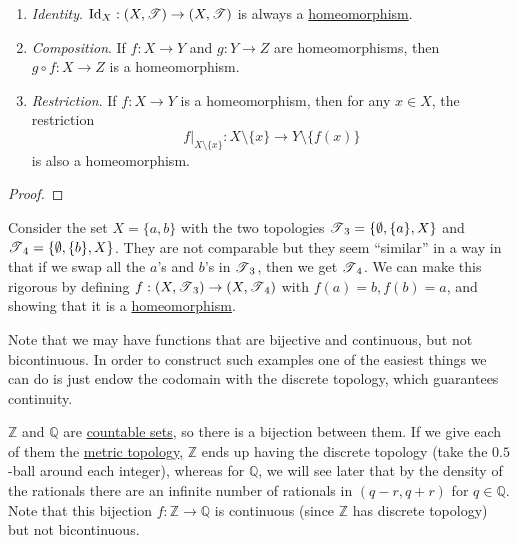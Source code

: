 	\begin{lemma}
	  \label{thm:properties-of-homeomorphisms}
	  \begin{enumerate}
	    \item \textit{Identity}. $\operatorname{Id}_X: (X, \operatorname{\mathscr{T}}) \to (X, \operatorname{\mathscr{T}})$ is always a \hyperref[def:homeomorphism]{homeomorphism}. 
			\item \textit{Composition}. If $f: X \to Y$ and $g: Y \to Z$ are homeomorphisms, then $g \circ f: X \to Z$ is a homeomorphism. 
			\item \textit{Restriction}. If $f: X \rightarrow Y$ is a homeomorphism, then for any $x \in X$, the restriction 
				\begin{equation}
					f|_{X \setminus \{x\}} : X \setminus \{x\} \rightarrow Y \setminus \{f(x)\}
				\end{equation}
				is also a homeomorphism. 
	  \end{enumerate}
	\end{lemma}
	\begin{proof}
	  
	\end{proof}

  \begin{example}
    \label{ex:comparability-and-homeomorphic-spaces}
    Consider the set $X = \{a, b\}$ with the two topologies $\operatorname{\mathscr{T}}_3 = \{\emptyset, \{a\}, X\}$ and $\operatorname{\mathscr{T}}_4 = \{\emptyset, \{b\}, X\}$. They are not comparable but they seem ``similar'' in a way in that if we swap all the $a$'s and $b$'s in $\operatorname{\mathscr{T}}_3$, then we get $\operatorname{\mathscr{T}}_4$. We can make this rigorous by defining $f: (X, \operatorname{\mathscr{T}}_3) \rightarrow (X, \operatorname{\mathscr{T}}_4)$ with $f(a) = b, f(b) = a$, and showing that it is a \hyperref[def:homeomorphism]{homeomorphism}. 
  \end{example}

	Note that we may have functions that are bijective and continuous, but not bicontinuous. In order to construct such examples one of the easiest things we can do is just endow the codomain with the discrete topology, which guarantees continuity. 

  \begin{example}
    \label{ex:bijective-and-continuous-but-not-homeomorphism}
    $\mathbb{Z}$ and $\mathbb{Q}$ are \hyperref[st-def:countable]{countable sets}, so there is a bijection between them. If we give each of them the \hyperref[def:metric-topology]{metric topology}, $\mathbb{Z}$ ends up having the discrete topology (take the $0.5$-ball around each integer), whereas for $\mathbb{Q}$, we will see later that by the density of the rationals there are an infinite number of rationals in $(q - r, q + r)$ for $q \in \mathbb{Q}$. Note that this bijection $f: \mathbb{Z} \rightarrow \mathbb{Q}$ is continuous (since $\mathbb{Z}$ has discrete topology) but not bicontinuous. 
  \end{example}


